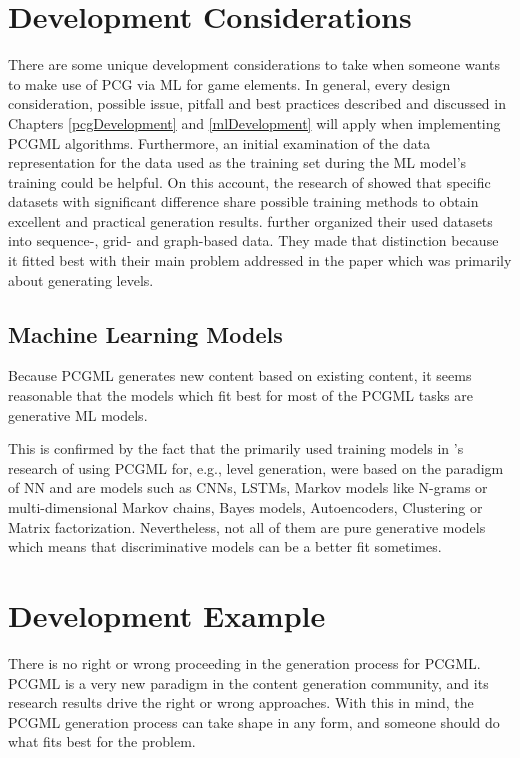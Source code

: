 \documentclass[MGS,Master,english]{twbook}%
\begin{document}
\section{Development Considerations} \label{PCGML::devConsiderations}
There are some unique development considerations to take when someone wants to make use of PCG via ML for game elements. In general, every design consideration, possible issue, pitfall and best practices described and discussed in Chapters \ref{pcgDevelopment} and \ref{mlDevelopment} will apply when implementing PCGML algorithms. Furthermore, an initial examination of the data representation for the data used as the training set during the ML model’s training could be helpful. On this account, the research of \citep{pcgml::paper} showed that specific datasets with significant difference share possible training methods to obtain excellent and practical generation results. \citep{pcgml::paper} further organized their used datasets into sequence-, grid- and graph-based data. They made that distinction because it fitted best with their main problem addressed in the paper which was primarily about generating levels.

\subsection{Machine Learning Models}
Because PCGML generates new content based on existing content, it seems reasonable that the models which fit best for most of the PCGML tasks are generative ML models.

This is confirmed by the fact that the primarily used training models in 's research of using PCGML for, e.g., level generation, were based on the paradigm of \ac{NN} and are models such as \acp{CNN}, \acp{LSTM}, Markov models like N-grams or multi-dimensional Markov chains, Bayes models, Autoencoders, Clustering or Matrix factorization. Nevertheless, not all of them are pure generative models which means that discriminative models can be a better fit sometimes.

\section{Development Example} \label{PCGML::devExample}
There is no right or wrong proceeding in the generation process for PCGML. PCGML is a very new paradigm in the content generation community, and its research results drive the right or wrong approaches. With this in mind, the PCGML generation process can take shape in any form, and someone should do what fits best for the problem.
\end{document}
